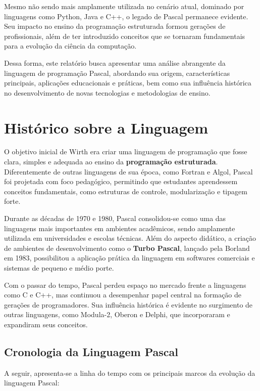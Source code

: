 \documentclass[12pt,a4paper,oneside]{abntex2}
\begin{document}
Mesmo não sendo mais amplamente utilizada no cenário atual, dominado por linguagens como Python, Java e C++, o legado de Pascal permanece evidente. Seu impacto no ensino da programação estruturada formou gerações de profissionais, além de ter introduzido conceitos que se tornaram fundamentais para a evolução da ciência da computação.

Dessa forma, este relatório busca apresentar uma análise abrangente da linguagem de programação Pascal, abordando sua origem, características principais, aplicações educacionais e práticas, bem como sua influência histórica no desenvolvimento de novas tecnologias e metodologias de ensino.

\chapter{Histórico sobre a Linguagem}
O objetivo inicial de Wirth era criar uma linguagem de programação que fosse clara, simples e adequada ao ensino da \textbf{programação estruturada}. Diferentemente de outras linguagens de sua época, como Fortran e Algol, Pascal foi projetada com foco pedagógico, permitindo que estudantes aprendessem conceitos fundamentais, como estruturas de controle, modularização e tipagem forte.

Durante as décadas de 1970 e 1980, Pascal consolidou-se como uma das linguagens mais importantes em ambientes acadêmicos, sendo amplamente utilizada em universidades e escolas técnicas. Além do aspecto didático, a criação de ambientes de desenvolvimento como o \textbf{Turbo Pascal}, lançado pela Borland em 1983, possibilitou a aplicação prática da linguagem em softwares comerciais e sistemas de pequeno e médio porte.

Com o passar do tempo, Pascal perdeu espaço no mercado frente a linguagens como C e C++, mas continuou a desempenhar papel central na formação de gerações de programadores. Sua influência histórica é evidente no surgimento de outras linguagens, como Modula-2, Oberon e Delphi, que incorporaram e expandiram seus conceitos.

\section{Cronologia da Linguagem Pascal}
A seguir, apresenta-se a linha do tempo com os principais marcos da evolução da linguagem Pascal:
\end{document}

